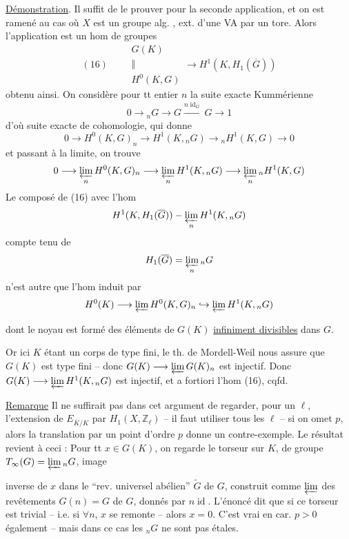 \uline{Démonstration}. Il suffit de le prouver pour la seconde application, et on est ramené au cas où $X$ est  un groupe alg. , ext. d'une VA par un tore. Alors l'application est un hom de groupes
\[
(16)\qquad \begin{gathered}G(K)\\\Vert\\H^0(K,G)\end{gathered}\longrightarrow H^1(K,H_1(\overline G))
\]
obtenu ainsi. On considère pour tt entier $n$ la suite exacte Kummérienne
\[
0\longrightarrow {}_nG\longrightarrow G\xrightarrow{n\operatorname{id}_G}G\longrightarrow1
\]
d'où suite exacte de cohomologie, qui donne
\[
0\longrightarrow H^0(K,G)_n\longrightarrow H^1(K,{}_nG)\longrightarrow {}_nH^1(K,G)\longrightarrow0
\]
et passant à la limite, on trouve
\[
0\longrightarrow\varprojlim_n H^0(K,G)_n\longrightarrow\varprojlim_n H^1(K,{}_nG)\longrightarrow\varprojlim_n {}_nH^1(K,G)
\]
Le composé de (16) avec l'hom  
\[
H^1(K,H_1(\overline G))-\varprojlim_n H^1(K,{}_nG)
\]
compte tenu de
\[
H_1(\overline G)=\varprojlim_n {}_nG
\]
n'est autre que l'hom induit par
\[
H^0(K)\longrightarrow\varprojlim H^0(K,G)_n\hookrightarrow\varprojlim H^1(K,{}_nG)
\]

dont le noyau  est formé des éléments de $G(K)$ \uline{infiniment divisibles} dans $G$.

Or ici $K$ étant un  corps  de type fini, le th. de Mordell-Weil nous assure que $G(K)$ est   type fini -- donc $G(K)\longrightarrow\varprojlim G(K)_n$ est injectif. Donc $G(K)\longrightarrow\varprojlim H^1(K,{}_nG)$ est injectif, et a fortiori l'hom (16), cqfd.

\uline{Remarque} Il ne suffirait pas dans cet argument de regarder, pour un $\ell$, l'extension de $E_{\overline K/K}$ par $H_1(X,\mathbb Z_\ell)$ -- il faut utiliser tous les $\ell$ -- si on omet $p$, alors la translation par un point d'ordre $p$ donne un contre-exemple.  Le résultat revient à ceci : Pour tt $x\in G(K)$, on regarde le torseur sur $K$, de groupe $T_\infty(G)=\varprojlim {}_nG$, image

inverse de $x$ dans le ``rev. universel abélien'' $\widetilde G$ de $G$, construit comme $\varprojlim$ des revêtements $G(n)=G$ de $G$, donnés par $n\operatorname{id}$. L'énoncé dit que si ce torseur est trivial -- i.e. si $\forall n$, $x$ se remonte -- alors $x=0$. C'est vrai en car. $p>0$ également -- mais dans ce cas les ${}_nG$ ne sont pas étales.

